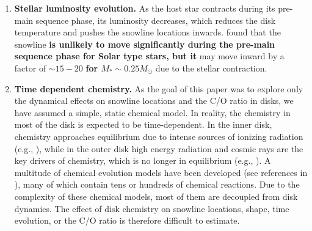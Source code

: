 \documentclass[apj]{emulateapj}
\newcommand{\emgr}[1]{\emph{ \color{gray} #1}}
\begin{document}
\begin{enumerate}

\item \textbf{Stellar luminosity evolution.} As the host star contracts during its pre-main sequence phase, its luminosity decreases, which reduces the disk temperature and pushes the snowline locations inwards. \citet{kennedy06} found that the snowline \textbf{is unlikely to move significantly during the pre-main sequence phase for Solar type stars, but it} may move inward by a factor of $\sim$$15-20$ \textbf{for $M_* \sim 0.25 M_{\odot}$} due to the stellar contraction. 

\item \textbf{Time dependent chemistry.} As the goal of this paper was to explore only the dynamical effects on snowline locations and the C/O ratio in disks, we have assumed a simple, static chemical model. In reality, the chemistry in most of the disk is expected to be time-dependent.%
In the inner disk, chemistry approaches equilibrium due to intense sources of ionizing radiation (e.g., \citealt{ilgner04}), while in the outer disk high energy radiation and cosmic rays are the key drivers of chemistry, which is no longer in equilibrium (e.g., \citealt{vandishoeck06}). A multitude of chemical evolution models have been developed (see references in \citealt{henning13}), many of which contain tens or hundreds of chemical reactions. Due to the complexity of these chemical models, most of them are decoupled from disk dynamics. The effect of disk chemistry on snowline locations, shape, time evolution, or the C/O ratio is therefore difficult to estimate.  %


\end{enumerate}



\end{document}
